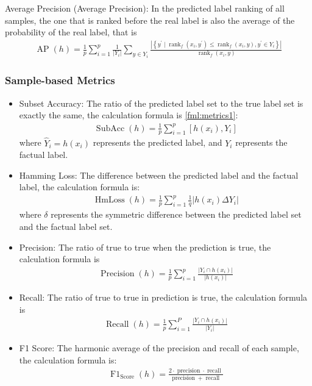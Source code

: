 Average Precision (Average Precision): In the predicted label ranking of all samples, the one that is ranked before the real label is also the average of the probability of the real label, that is
\begin{align}
	\operatorname{AP}(h)=\frac{1}{p} \sum_{i=1}^{p} \frac{1}{\left|Y_{i}\right|} \sum_{y \in Y_{i}} \frac{\left|\left\{y^{\prime} \mid \operatorname{rank}_{f}\left(x_{i}, y^{\prime}\right) \leq \operatorname{rank}_{f}\left(x_{i}, y\right), y^{\prime} \in Y_{i}\right\}\right|}{\operatorname{rank}_{f}\left(x_{i}, y\right)}
\end{align}

\subsubsection{Sample-based Metrics}
\begin{itemize}
	\item Subset Accuracy: The ratio of the predicted label set to the true label set is exactly the same, the calculation formula is \ref{fml:metrics1}:
	      \begin{align}
		      \operatorname{SubAcc}(h)=\frac{1}{p} \sum_{i=1}^{p}\left[{h}\left(x_{i}\right), Y_{i}\right] \label{fml:metrics1}
	      \end{align}
	      where $\hat{Y}_i=h(x_i)$ represents the predicted label, and $Y_i$ represents the factual label.
	\item Hamming Loss: The difference between the predicted label and the factual label, the calculation formula is:
	      \begin{align}
		      \operatorname{HmLoss}(h)=\frac{1}{p} \sum_{i=1}^{p} \frac{1}{q}\left|h\left(x_{i}\right) \Delta Y_{i}\right|
	      \end{align}
	      where $\delta$ represents the symmetric difference between the predicted label set and the factual label set.
	\item Precision: The ratio of true to true when the prediction is true, the calculation formula is
	      \begin{align}
		      \operatorname{ Precision }(h)=\frac{1}{p} \sum_{i=1}^{p} \frac{\left|Y_{i} \cap h\left(x_{i}\right)\right|}{\left|h\left(x_{i}\right)\right|}
	      \end{align}
	\item Recall: The ratio of true to true in prediction is true, the calculation formula is
	      \begin{align}
		      \operatorname{Recall}(h)=\frac{1}{p} \sum_{i=1}^{P} \frac{\left|Y_{i} \cap h\left(x_{i}\right)\right|}{\left|Y_{i}\right|}
	      \end{align}
	\item F1 Score: The harmonic average of the precision and recall of each sample, the calculation formula is:
	      \begin{align}
		      \operatorname{F1}_{\text{Score}}(h)=\frac{2 \cdot \operatorname{precision} \cdot \operatorname {recall }}{\operatorname {precision }+\operatorname {recall }}
	      \end{align}

\end{itemize}



